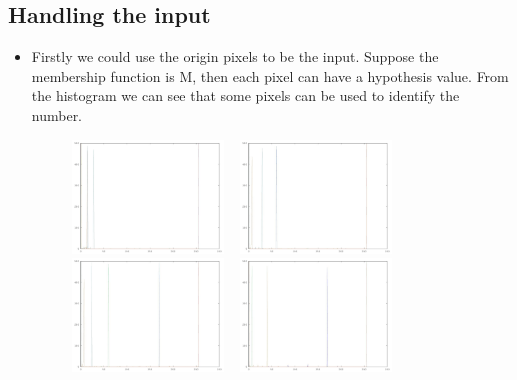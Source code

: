 \documentclass[12pt]{article} %
\begin{document}
\subsection{Handling the input}
\begin{itemize}
\item[\textbullet] Firstly we could use the origin pixels to be the input. Suppose the membership function is M, then each pixel can have a hypothesis value. From the histogram we can see that some pixels can be used to identify the number. 
    \begin{figure}[!htb]
        \begin{center}
            \includegraphics[width=0.38\textwidth]{26}
            \mbox{    }
            \includegraphics[width=0.38\textwidth]{27}
            \mbox{    }
            \includegraphics[width=0.38\textwidth]{28}
            \mbox{    }
            \includegraphics[width=0.38\textwidth]{31}
            \mbox{    }
        \end{center}

\end{figure}
\end{itemize}
\end{document}
